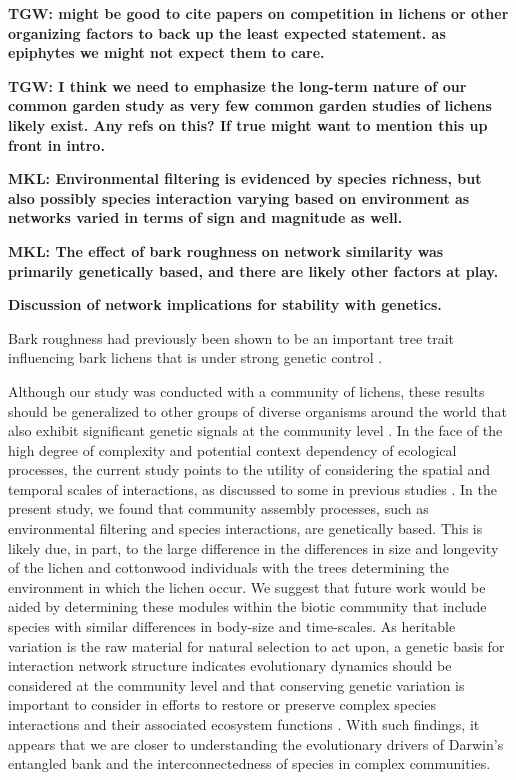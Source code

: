 \documentclass[11pt,twocolumn,twoside,lineno]{pnas-new}
\begin{document}
\textbf{TGW: might be good to cite papers on competition in lichens or
  other organizing factors to back up the least expected statement.
  as epiphytes we might not expect them to care.}

\textbf{TGW: I think we need to emphasize the long-term nature of our
  common garden study as very few common garden studies of lichens
  likely exist. Any refs on this? If true might want to mention this
  up front in intro.}

\textbf{MKL: Environmental filtering is evidenced by species richness,
  but also possibly species interaction varying based on environment
  as networks varied in terms of sign and magnitude as well.}

\textbf{MKL: The effect of bark roughness on network similarity was
  primarily genetically based, and there are likely other factors at
  play.}

\textbf{Discussion of network implications for stability with genetics.}

Bark roughness had previously been shown to be an important tree trait
influencing bark lichens \cite{Lamit2011} that is under strong genetic
control \cite{Bdeir2017}.

Although our study was conducted with a community of lichens, these
results should be generalized to other groups of diverse organisms
around the world that also exhibit significant genetic signals at the
community level \cite{Rowntree2011, Whitham2012}. In the face of the
high degree of complexity and potential context dependency of
ecological processes, the current study points to the utility of
considering the spatial and temporal scales of interactions, as
discussed to some in previous studies \cite{Bangert2006, Zook2010,
  Zytynska2012}. In the present study, we found that community
assembly processes, such as environmental filtering and species
interactions, are genetically based. This is likely due, in part, to
the large difference in the differences in size and longevity of the
lichen and cottonwood individuals with the trees determining the
environment in which the lichen occur. We suggest that future work
would be aided by determining these modules within the biotic
community that include species with similar differences in body-size
and time-scales. As heritable variation is the raw material for
natural selection to act upon, a genetic basis for interaction network
structure indicates evolutionary dynamics should be considered at the
community level and that conserving genetic variation is important to
consider in efforts to restore or preserve complex species
interactions and their associated ecosystem functions
\cite{Evans2013}.  With such findings, it appears that we are closer
to understanding the evolutionary drivers of Darwin's entangled bank
and the interconnectedness of species in complex communities.
\end{document}
